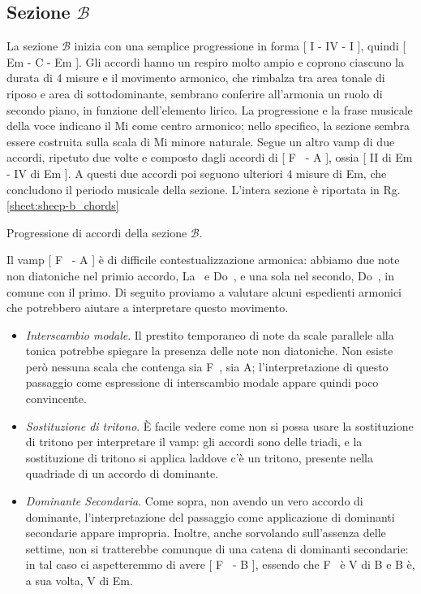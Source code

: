 \documentclass[class=book, crop=false, oneside, 12pt]{standalone}
\begin{document}
    \subsection{Sezione \(\mathcal{B}\)}
    La sezione \(\mathcal{B}\) inizia con una semplice progressione in forma [ I - IV - I ], quindi [ Em - C - Em ]. Gli accordi hanno un respiro molto ampio e coprono ciascuno la durata di \(4\) misure e il movimento armonico, che rimbalza tra area tonale di riposo e area di sottodominante, sembrano conferire all'armonia un ruolo di secondo piano, in funzione dell'elemento lirico. La progressione e la frase musicale della voce indicano il Mi come centro armonico; nello specifico, la sezione sembra essere costruita sulla scala di Mi minore naturale.
    Segue un altro vamp di due accordi, ripetuto due volte e composto dagli accordi di [ F\sharp~ - A ], ossia [ II di Em - IV di Em ].  A questi due accordi poi seguono ulteriori \(4\) misure di Em, che concludono il periodo musicale della sezione. L'intera sezione è riportata in Rg.\ref{sheet:sheep-b_chords}

    \begin{sheet}[htbp]
        \centering
        \caption{Progressione di accordi della sezione \(\mathcal{B}\).}
        \label{sheet:sheep-b_chords}
    \end{sheet}
    

    Il vamp [ F\sharp~ - A ] è  di difficile contestualizzazione armonica: abbiamo due note non diatoniche nel primio accordo, La\sharp~ e Do\sharp~, e una sola nel secondo, Do\sharp~, in comune con il primo. Di seguito proviamo a valutare alcuni espedienti armonici che potrebbero aiutare a interpretare questo movimento.
    \begin{itemize}
        \item \emph{Interscambio modale}. Il prestito temporaneo di note da scale parallele alla tonica potrebbe spiegare la presenza delle note non diatoniche. Non esiste però nessuna scala che contenga sia F\sharp~, sia A; l'interpretazione di questo passaggio come espressione di interscambio modale appare quindi poco convincente.
        \item \emph{Sostituzione di tritono}. È facile vedere come non si possa usare la sostituzione di tritono per interpretare il vamp: gli accordi sono delle triadi, e la sostituzione di tritono si applica laddove c'è un tritono, presente nella quadriade di un accordo di dominante.
        \item \emph{Dominante Secondaria}. Come sopra, non avendo un vero accordo di dominante, l'interpretazione del passaggio come applicazione di dominanti secondarie appare impropria. Inoltre, anche sorvolando sull'assenza delle settime, non si tratterebbe comunque di una catena di dominanti secondarie: in tal caso ci aspetteremmo di avere [ F\sharp~ - B ], essendo che F\sharp~ è V di B e B è, a sua volta, V di Em.
    \end{itemize}
    
\end{document}
